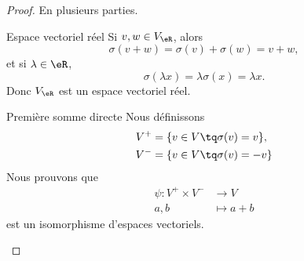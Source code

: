 \begin{proof}
    En plusieurs parties.
    \begin{subproof}
    \item[Espace vectoriel réel]
        Si \( v,w\in V_{\eR}\), alors 
        \begin{equation}
            \sigma(v+w)=\sigma(v)+\sigma(w)=v+w,
        \end{equation}
        et si \( \lambda\in \eR\),
        \begin{equation}
            \sigma(\lambda x)=\lambda\sigma(x)=\lambda x.
        \end{equation}
        Donc \( V_{\eR}\) est un espace vectoriel réel.
    \item[Première somme directe]
        Nous définissons
        \begin{subequations}
            \begin{align}
                V^+&=\{ v\in V\tq \sigma(v)=v \},\\
                V^-&=\{ v\in V\tq \sigma(v)=-v \}
            \end{align}
        \end{subequations}
        Nous prouvons que
        \begin{equation}
            \begin{aligned}
                \psi\colon V^+\times V^-&\to V \\
                a,b&\mapsto a+b 
            \end{aligned}
        \end{equation}
        est un isomorphisme d'espaces vectoriels.


\end{subproof}
\end{proof}
